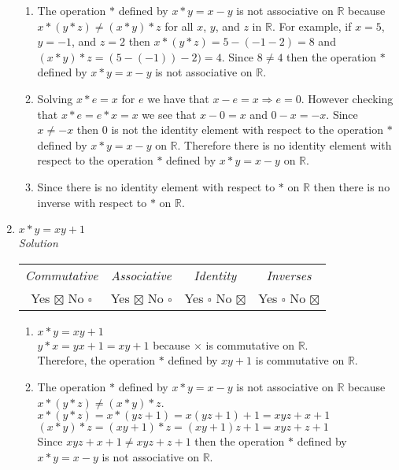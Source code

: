 \documentclass[12pt]{article}
\begin{document}
\begin{flushleft}
\begin{enumerate}
\begin{enumerate}
	\item The operation $*$ defined by $x * y = x - y$ is not associative on $\mathbb{R}$ because $x * (y * z) \neq (x * y) * z$ for all $x$, $y$, and $z$ in $\mathbb{R}$. For example, if $x = 5$, $y = -1$, and $z = 2$ then $x * (y * z) = 5-(-1-2) = 8$ and $(x * y) * z = (5 - (-1)) -2) = 4$. Since $8 \neq 4$ then the operation $*$ defined by $x * y = x - y$ is not associative on $\mathbb{R}$.
	
	\item Solving $x * e = x$ for $e$ we have that $x - e = x \Rightarrow e = 0$. However checking that $x * e = e * x = x$ we see that $x - 0 = x$ and $0 - x = -x$. Since $x \neq -x$ then $0$ is not the identity element with respect to the operation $*$ defined by $x * y = x - y$ on $\mathbb{R}$. Therefore there is no identity element with respect to the operation $*$ defined by $x * y = x - y$ on $\mathbb{R}$.
	
	\item Since there is no identity element with respect to $*$ on $\mathbb{R}$ then there is no inverse with respect to $*$ on $\mathbb{R}$.
	
	
	\end{enumerate}
	
\item $x * y = xy + 1 $ \\
	\medskip
	\textit{Solution}
	\medskip
	
	\begin{tabular}{c c c c}
	\textit{Commutative} & \textit{Associative} & \textit{Identity} & \textit{Inverses} \\
	Yes $\boxtimes$ No $\square$ & Yes $\boxtimes$ No $\square$ & Yes $\square$ No $\boxtimes$ & Yes $\square$ No $\boxtimes$ \\
	\end{tabular}

	\begin{enumerate}
	\item $x * y  = xy + 1 $ \\
	$y * x = yx + 1 = xy + 1$ because $\times$ is commutative on $\mathbb{R}$. \\
	Therefore, the operation $*$ defined by $xy + 1$ is commutative on $\mathbb{R}$.

	\item The operation $*$ defined by $x * y = x - y$ is not associative on $\mathbb{R}$ because $x * (y * z) \neq (x * y) * z$. \\
	$x * (y * z) = x * (yz + 1) = x(yz + 1) + 1 = xyz + x + 1$ \\
	$(x * y) * z = (xy + 1) * z = (xy + 1)z + 1 = xyz + z + 1$ \\
	Since $xyz + x + 1 \neq xyz + z + 1$ then the operation $*$ defined by $x * y = x - y$ is not associative on $\mathbb{R}$.
	

\end{enumerate}
\end{enumerate}
\end{flushleft}
\end{document}
